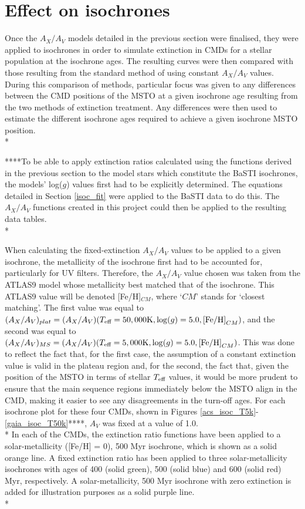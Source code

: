 \documentclass[12pt, a4paper]{report}
\begin{document}
\section{Effect on isochrones} \label{result_CMDs}
Once the $A_{X}/A_{V}$ models detailed in the previous section were finalised, they were applied to isochrones in order to simulate extinction in CMDs for a stellar population at the isochrone ages. The resulting curves were then compared with those resulting from the standard method of using constant $A_{X}/A_{V}$ values. During this comparison of methods, particular focus was given to any differences between the CMD positions of the MSTO at a given isochrone age resulting from the two methods of extinction treatment. Any differences were then used to estimate the different isochrone ages required to achieve a given isochrone MSTO position. \\*

****To be able to apply extinction ratios calculated using the functions derived in the previous section to the model stars which constitute the BaSTI isochrones, the models' log($g$) values first had to be explicitly determined. The equations detailed in Section \ref{isoc_fit} were applied to the BaSTI data to do this. The $A_{X}/A_{V}$ functions created in this project could then be applied to the resulting data tables. \\*

When calculating the fixed-extinction $A_{X}/A_{V}$ values to be applied to a given isochrone, the metallicity of the isochrone first had to be accounted for, particularly for UV filters. Therefore, the $A_{X}/A_{V}$ value chosen was taken from the ATLAS9 model whose metallicity best matched that of the isochrone. This ATLAS9 value will be denoted [Fe/H]$_{CM}$, where `$CM$' stands for `closest matching'. The first value was equal to $(A_{X}/A_{V})_{plat} = (A_{X}/A_{V})(T_{\textnormal{eff}} = 50,000\textnormal{K},\log(g) = 5.0,\textnormal{[Fe/H]}_{CM})$, and the second was equal to $(A_{X}/A_{V})_{MS} = (A_{X}/A_{V})(T_{\textnormal{eff}} = 5,000\textnormal{K},\log(g) = 5.0,\textnormal{[Fe/H]}_{CM})$. This was done to reflect the fact that, for the first case, the assumption of a constant extinction value is valid in the plateau region and, for the second, the fact that, given the position of the MSTO in terms of stellar $T_{\textnormal{eff}}$ values, it would be more prudent to ensure that the main sequence regions immediately below the MSTO align in the CMD, making it easier to see any disagreements in the turn-off ages. For each isochrone plot for these four CMDs, shown in Figures \ref{acs_isoc_T5k}-\ref{gaia_isoc_T50k}****, $A_{V}$ was fixed at a value of 1.0.\\*
In each of the CMDs, the extinction ratio functions have been applied to a solar-metallicity ([Fe/H] = 0), 500 Myr isochrone, which is shown as a solid orange line. A fixed extinction ratio has been applied to three solar-metallicity isochrones with ages of 400 (solid green), 500 (solid blue) and 600 (solid red) Myr, respectively. A solar-metallicity, 500 Myr isochrone with zero extinction is added for illustration purposes as a solid purple line.\\*
\end{document}
